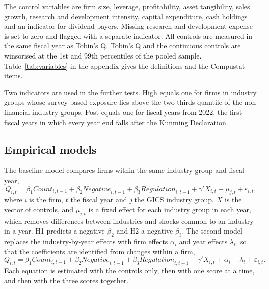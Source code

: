 \documentclass[12pt,a4paper]{article}
\begin{document}
The control variables are firm size, leverage, profitability, asset tangibility, sales growth, research and development intensity, capital expenditure, cash holdings and an indicator for dividend payers. Missing research and development expense is set to zero and flagged with a separate indicator. All controls are measured in the same fiscal year as Tobin's Q. Tobin's Q and the continuous controls are winsorised at the 1st and 99th percentiles of the pooled sample. Table~\ref{tab:variables} in the appendix gives the definitions and the Compustat items.

Two indicators are used in the further tests. High equals one for firms in industry groups whose survey-based exposure lies above the two-thirds quantile of the non-financial industry groups. Post equals one for fiscal years from 2022, the first fiscal years in which every year end falls after the Kunming Declaration.

\subsection{Empirical models}

The baseline model compares firms within the same industry group and fiscal year,
\begin{equation}
Q_{i,t} = \beta_1 \mathit{Count}_{i,t-1} + \beta_2 \mathit{Negative}_{i,t-1} + \beta_3 \mathit{Regulation}_{i,t-1} + \gamma' X_{i,t} + \mu_{j,t} + \varepsilon_{i,t},
\label{eq:baseline}
\end{equation}
where $i$ is the firm, $t$ the fiscal year and $j$ the GICS industry group. $X$ is the vector of controls, and $\mu_{j,t}$ is a fixed effect for each industry group in each year, which removes differences between industries and shocks common to an industry in a year. H1 predicts a negative $\beta_2$ and H2 a negative $\beta_3$. The second model replaces the industry-by-year effects with firm effects $\alpha_i$ and year effects $\lambda_t$, so that the coefficients are identified from changes within a firm,
\begin{equation}
Q_{i,t} = \beta_1 \mathit{Count}_{i,t-1} + \beta_2 \mathit{Negative}_{i,t-1} + \beta_3 \mathit{Regulation}_{i,t-1} + \gamma' X_{i,t} + \alpha_i + \lambda_t + \varepsilon_{i,t}.
\label{eq:firm}
\end{equation}
Each equation is estimated with the controls only, then with one score at a time, and then with the three scores together.
\end{document}
